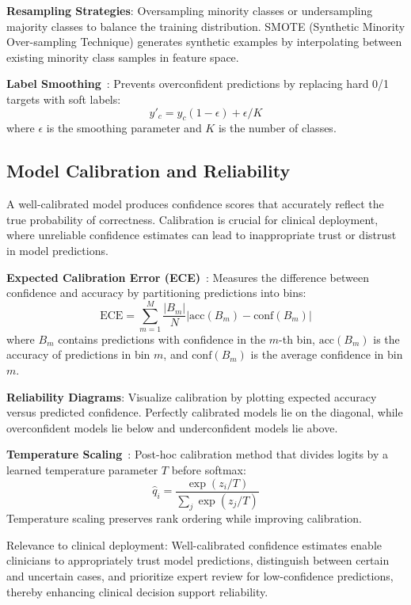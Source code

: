 \textbf{Resampling Strategies}: Oversampling minority classes or undersampling majority classes to balance the training distribution. SMOTE (Synthetic Minority Over-sampling Technique) generates synthetic examples by interpolating between existing minority class samples in feature space.

\textbf{Label Smoothing}~\cite{szegedy2016rethinking}: Prevents overconfident predictions by replacing hard 0/1 targets with soft labels:
\begin{equation}
y'_c = y_c(1-\epsilon) + \epsilon/K
\end{equation}
where $\epsilon$ is the smoothing parameter and $K$ is the number of classes.

\subsection{Model Calibration and Reliability}

A well-calibrated model produces confidence scores that accurately reflect the true probability of correctness. Calibration is crucial for clinical deployment, where unreliable confidence estimates can lead to inappropriate trust or distrust in model predictions.

\textbf{Expected Calibration Error (ECE)}~\cite{guo2017calibration}: Measures the difference between confidence and accuracy by partitioning predictions into bins:
\begin{equation}
\text{ECE} = \sum_{m=1}^M \frac{|B_m|}{N} |\text{acc}(B_m) - \text{conf}(B_m)|
\end{equation}
where $B_m$ contains predictions with confidence in the $m$-th bin, $\text{acc}(B_m)$ is the accuracy of predictions in bin $m$, and $\text{conf}(B_m)$ is the average confidence in bin $m$.

\textbf{Reliability Diagrams}: Visualize calibration by plotting expected accuracy versus predicted confidence. Perfectly calibrated models lie on the diagonal, while overconfident models lie below and underconfident models lie above.

\textbf{Temperature Scaling}~\cite{guo2017calibration}: Post-hoc calibration method that divides logits by a learned temperature parameter $T$ before softmax:
\begin{equation}
\hat{q}_i = \frac{\exp(z_i/T)}{\sum_j \exp(z_j/T)}
\end{equation}
Temperature scaling preserves rank ordering while improving calibration.

Relevance to clinical deployment: Well-calibrated confidence estimates enable clinicians to appropriately trust model predictions, distinguish between certain and uncertain cases, and prioritize expert review for low-confidence predictions, thereby enhancing clinical decision support reliability.
